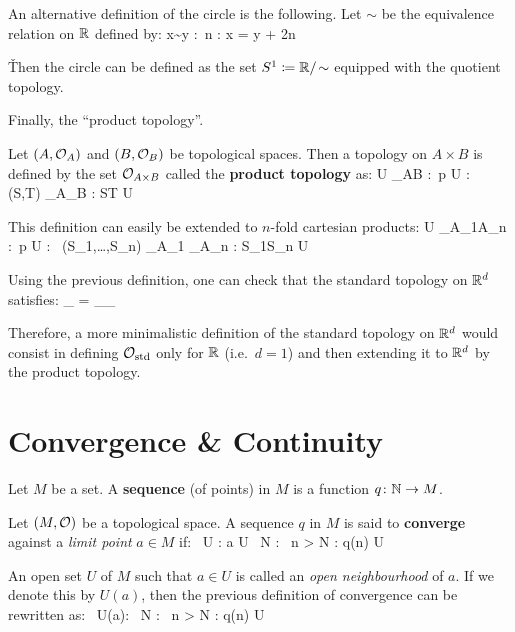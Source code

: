 An alternative definition of the circle is the following. Let $\sim$ be the equivalence relation on $\mathbb{R}$ defined by:
\bse
x\sim y :\eqv \exists \, n \in \Z : x = y + 2\pi n
\ese

\v

Then the circle can be defined as the set $S^1 \coloneqq \mathbb{R}/\!\sim$ equipped with the quotient topology.
\ee

Finally, the ``product topology''.

Let $(A,\mathcal{O}_A)$ and $(B,\mathcal{O}_B)$ be topological spaces. Then a topology on $A\times B$ is defined by the set
$\mathcal{O}_{A\times B}$ called the \textbf{product topology} as:
\bse
U \in \cO_{A\times B} :\eqv \forall \, p \in U : \exists \, (S,T) \in \cO_A\times \cO_B : S\times T \se U
\ese
\ed

This definition can easily be extended to $n$-fold cartesian products:
\bse
U \in \cO_{A_1\times \cdots \times A_n} :\eqv \forall \, p \in U : \exists \, (S_1,\ldots,S_n) \in \cO_{A_1}\times
\cdots \times \cO_{A_n} : S_1\times \cdots\times S_n \se U
\ese

Using the previous definition, one can check that the standard topology on $\mathbb{R}^d$ satisfies:
\bse
\cO_ = \cO_{\underbrace{\scriptstyle \R\times\R\times\cdots\times\R}_}
\ese

Therefore, a more minimalistic definition of the standard topology on $\mathbb{R}^d$ would consist in defining
$\mathcal{O}_\mathrm{std}$ only for $\mathbb{R}$ (i.e.\ $d=1$) and then extending it to $\mathbb{R}^d$ by the product topology.

\section{Convergence \& Continuity}

\bd [Sequence]
Let $M$ be a set. A \textbf{sequence} (of points) in $M$ is a function $q \colon \mathbb{N} \to M$.
\ed

\bd [Convergence]
Let $(M,\mathcal{O})$ be a topological space. A sequence $q$ in $M$ is said to \textbf{converge} against a \emph{limit point}
$a\in M$ if:
\bse
\forall \, U \in \cO : a \in U \imp \exists \, N \in \N : \forall \, n > N : q(n) \in U
\ese
\ed

An open set $U$ of $M$ such that $a\in U$ is called an \emph{open neighbourhood} of $a$. If we denote this by $U(a)$,
then the previous definition of convergence can be rewritten as:
\bse
\forall \, U(a): \exists \, N \in \N : \forall \, n > N : q(n) \in U
\ese
\be

